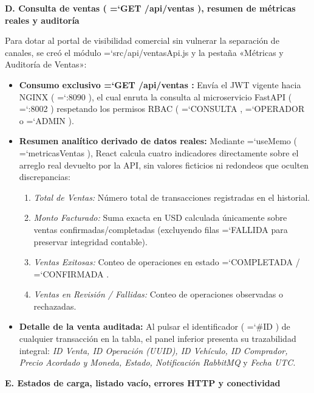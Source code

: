 \documentclass[11pt,a4paper]{article}
\renewcommand{\_}{\oldunderscore\allowbreak}
\DeclareRobustCommand{\texttt}[1]{%
  {\upshape\ttfamily\fontsize{9}{10.8}\selectfont\hyphenchar\font=`\-\relax #1}%
}
\begin{document}
\vspace{0.2cm}
\noindent\textbf{D. Consulta de ventas (\texttt{GET /\allowbreak{}api/\allowbreak{}ventas}), resumen de métricas reales y auditoría}

\noindent Para dotar al portal de visibilidad comercial sin vulnerar la separación de canales, se creó el módulo \texttt{src/\allowbreak{}api/\allowbreak{}ventasApi.\allowbreak{}js} y la pestaña «Métricas y Auditoría de Ventas»:
\begin{itemize}[leftmargin=*,itemsep=2pt,topsep=1pt]
  \item \textbf{Consumo exclusivo \texttt{GET /\allowbreak{}api/\allowbreak{}ventas}:} Envía el JWT vigente hacia NGINX (\texttt{:8090}), el cual enruta la consulta al microservicio FastAPI (\texttt{:8002}) respetando los permisos RBAC (\texttt{CONSULTA}, \texttt{OPERADOR} o \texttt{ADMIN}).
  \item \textbf{Resumen analítico derivado de datos reales:} Mediante \texttt{useMemo} (\texttt{metricasVentas}), React calcula cuatro indicadores directamente sobre el arreglo real devuelto por la API, sin valores ficticios ni redondeos que oculten discrepancias:
  \begin{enumerate}[leftmargin=*,itemsep=1pt,topsep=1pt]
    \item \textit{Total de Ventas:} Número total de transacciones registradas en el historial.
    \item \textit{Monto Facturado:} Suma exacta en USD calculada únicamente sobre ventas confirmadas/completadas (excluyendo filas \texttt{FALLIDA} para preservar integridad contable).
    \item \textit{Ventas Exitosas:} Conteo de operaciones en estado \texttt{COMPLETADA} / \texttt{CONFIRMADA}.
    \item \textit{Ventas en Revisión / Fallidas:} Conteo de operaciones observadas o rechazadas.
  \end{enumerate}
  \item \textbf{Detalle de la venta auditada:} Al pulsar el identificador (\texttt{\#ID}) de cualquier transacción en la tabla, el panel inferior presenta su trazabilidad integral: \textit{ID Venta, ID Operación (UUID), ID Vehículo, ID Comprador, Precio Acordado y Moneda, Estado, Notificación RabbitMQ} y \textit{Fecha UTC}.
\end{itemize}

\vspace{0.2cm}
\noindent\textbf{E. Estados de carga, listado vacío, errores HTTP y conectividad}
\end{document}
